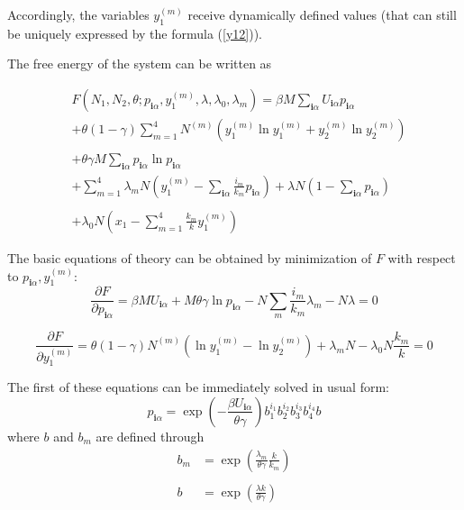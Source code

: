 \documentclass[12pt,abstract]{scrartcl}
\begin{document}
Accordingly, the variables  $y_1^{(m)}$ receive dynamically defined values (that  can still be uniquely expressed by  the formula (\ref{y12})).

The free energy of the system can be written as

\begin{equation} \label{free_energy30}
\begin{split}
& F(N_1, N_2, \theta; p_{\mathbf{i}  \alpha},  y_1^{(m)}, \lambda, \lambda_0, \lambda_m) = \beta M \sum_{\mathbf{i}  \alpha}U_{\mathbf{i}  \alpha} p_{\mathbf{i}  \alpha}  \\
&+ \theta(1- \gamma) \sum_{m = 1}^4  N^{(m)} ( y_1^{(m)} \ln y_1^{(m)} + y_2^{(m)} \ln y_2^{(m)} )\\
\\
&+ \theta \gamma M \sum_{\mathbf{i}  \alpha} p_{\mathbf{i}  \alpha} \ln p_{\mathbf{i}  \alpha}\\
&+ \sum_{m=1}^4 \lambda_m N \left(y_1^{(m)} -  \sum_{\mathbf{i} \alpha} \frac{i_m}{k_m} p_{\mathbf{i} \alpha} \right) 
+ \lambda N \left(1- \sum_{\mathbf{i} \alpha}p_{\mathbf{i} \alpha}   \right)\\ 
\\
&+ \lambda_0 N \left(x_1 - \sum_{m=1}^4 \frac{k_m}{k} y_1^{(m)} \right)
\end{split}
\end{equation}


The basic equations of theory can be  obtained  by minimization of $F$ with respect to $ p_{\mathbf{i}  \alpha},  y_1^{(m)}$:
\begin{equation} \label{basic_equation3}
    \frac{\partial F}{\partial p_{\mathbf{i} \alpha}} = \beta M U_{\mathbf{i}  \alpha}+ M \theta \gamma \ln p_{\mathbf{i} \alpha} 
- N \sum_m \frac{i_m}{k_m} \lambda_m - N \lambda = 0  
\end{equation} 

\begin{equation} \label{basic_equation3b}
\frac{\partial F}{\partial y_1^{(m)}}  =
\theta(1- \gamma) N^{(m)} ( \ln y_1^{(m)} - \ln y_2^{(m)}) + \lambda_m N - \lambda_0 N \frac{k_m}{k} = 0
\end{equation} 

The first of these equations can be immediately solved in usual  \cite{TISR_p1} form:
\begin{equation} \label{pia3}
    p_{\mathbf{i} \alpha} = \exp \left(- \frac{ \beta U_{\mathbf{i}  \alpha} }{\theta\gamma }\right) 
b_1^{i_1} b_2^{i_2} b_3^{i_3} b_4^{i_4} b
\end{equation}
where $b$ and $b_m$ are defined through
\begin{equation} \label{bb}
\begin{split}
b_m & = \exp \left( \frac{\lambda_m}{\theta \gamma} \frac{k}{k_m} \right)\\
\\
b & =  \exp \left( \frac{\lambda k}{\theta \gamma} \right)
\end{split}
\end{equation}
\end{document}
